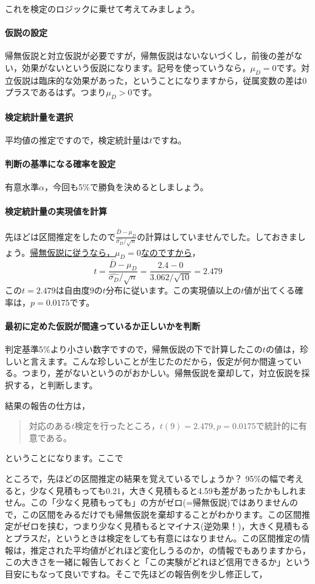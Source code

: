 \documentclass{ltjsbook}
\begin{document}
これを検定のロジックに乗せて考えてみましょう。
\paragraph{仮説の設定}帰無仮説と対立仮説が必要ですが，帰無仮説はないないづくし，前後の差がない，効果がないという仮説になります。記号を使っていうなら，$\mu_D=0$です。対立仮説は臨床的な効果があった，ということになりますから，従属変数の差は0プラスであるはず。つまり$\mu_D > 0$です。
\paragraph{検定統計量を選択}平均値の推定ですので，検定統計量は$t$ですね。
\paragraph{判断の基準になる確率を設定}有意水準$\alpha$，今回も5\%で勝負を決めるとしましょう。
\paragraph{検定統計量の実現値を計算}先ほどは区間推定をしたので$\frac{\bar{D}-\mu_D}{\hat{\sigma_D}/\sqrt{n}} $の計算はしていませんでした。しておきましょう。\underline{帰無仮説に従うなら，$\mu_D=0$なのですから}，
\[t= \frac{\bar{D}-\mu_D}{\hat{\sigma_D}/\sqrt{n}}  = \frac{2.4-0}{3.062/\sqrt{10}}  = 2.479\]
この$t = 2.479$は自由度$9$の$t$分布に従います。この実現値以上の$t$値が出てくる確率は，$p=0.0175$です。
\paragraph{最初に定めた仮説が間違っているか正しいかを判断}
判定基準5\%より小さい数字ですので，帰無仮説の下で計算したこの$t$の値は，珍しいと言えます。こんな珍しいことが生じたのだから，仮定が何か間違っている。つまり，差がないというのがおかしい。帰無仮説を棄却して，対立仮説を採択する，と判断します。

結果の報告の仕方は，
\begin{quote}
    対応のある$t$検定を行ったところ，$t(9)=2.479,p=0.0175$で統計的に有意である。
\end{quote}
ということになります。ここで

ところで，先ほどの区間推定の結果を覚えているでしょうか？ 95\%の幅で考えると，少なく見積もっても0.21，大きく見積もると4.59も差があったかもしれません。この「少なく見積もっても」の方がゼロ(=帰無仮説)ではありませんので，この区間をみるだけでも帰無仮説を棄却することがわかります。この区間推定がゼロを挟む，つまり少なく見積もるとマイナス(逆効果！)，大きく見積もるとプラスだ，というときは検定をしても有意にはなりません。この区間推定の情報は，推定された平均値がどれほど変化しうるのか，の情報でもありますから，この大きさを一緒に報告しておくと「この実験がどれほど信用できるか」という目安にもなって良いですね。そこで先ほどの報告例を少し修正して，
\end{document}

